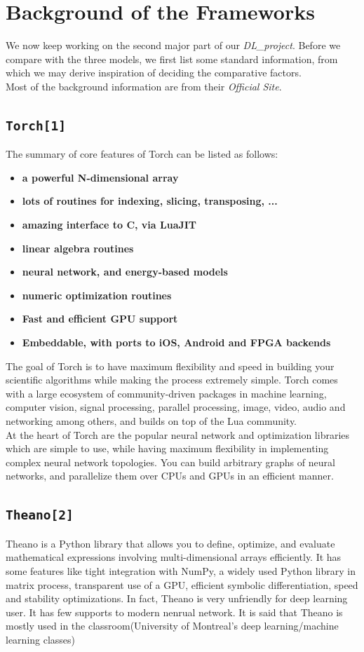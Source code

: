 \documentclass[12pt]{article}
\begin{document}
\section{Background of the Frameworks}

We now keep working on the second major part of our {\it DL\_project}. Before we compare with the three models, we first list some standard information, from which we may derive inspiration of deciding the comparative factors.\\
Most of the background information are from their {\it Official Site}.

\subsection{\texttt{Torch[1]}}
The summary of core features of Torch can be listed as follows:
\begin{itemize}
	\item {\bf a powerful N-dimensional array}
	\item {\bf lots of routines for indexing, slicing, transposing, ...}
	\item {\bf amazing interface to C, via LuaJIT}
	\item {\bf linear algebra routines}
	\item {\bf neural network, and energy-based models}
	\item {\bf numeric optimization routines}
	\item {\bf Fast and efficient GPU support}
	\item {\bf Embeddable, with ports to iOS, Android and FPGA backends}
\end{itemize}
The goal of Torch is to have maximum flexibility and speed in building your scientific algorithms while making the process extremely simple. Torch comes with a large ecosystem of community-driven packages in machine learning, computer vision, signal processing, parallel processing, image, video, audio and networking among others, and builds on top of the Lua community.\\
At the heart of Torch are the popular neural network and optimization libraries which are simple to use, while having maximum flexibility in implementing complex neural network topologies. You can build arbitrary graphs of neural networks, and parallelize them over CPUs and GPUs in an efficient manner.
\subsection{\texttt{Theano[2]}}
Theano is a Python library that allows you to define, optimize, and evaluate mathematical expressions involving multi-dimensional arrays efficiently. It has some features like tight integration with NumPy, a widely used Python library in matrix process, transparent use of a GPU, efficient symbolic differentiation, speed and stability optimizations. In fact, Theano is very unfriendly for deep learning user. It has few supports to modern nenrual network. It is said that Theano is mostly used in the classroom(University of Montreal’s deep learning/machine learning classes)
\end{document}

